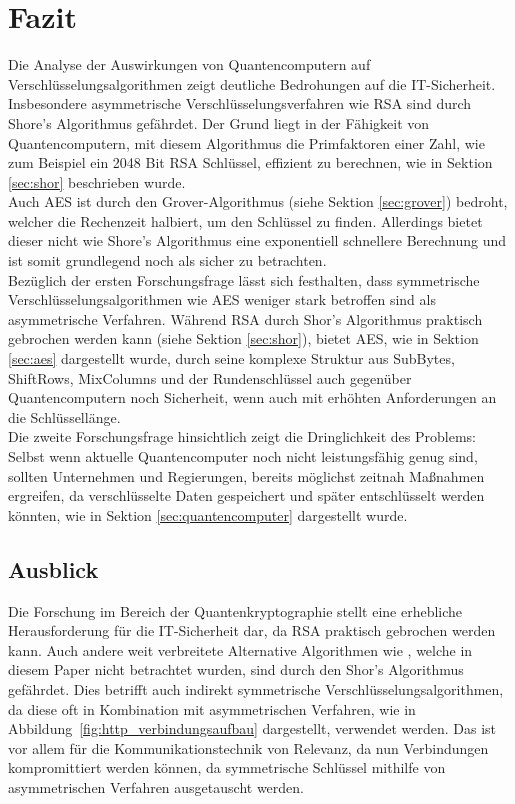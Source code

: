 \section{Fazit}
Die Analyse der Auswirkungen von Quantencomputern auf Verschlüsselungsalgorithmen
zeigt deutliche Bedrohungen auf die IT-Sicherheit. Insbesondere asymmetrische 
Verschlüsselungsverfahren wie RSA sind durch Shore's Algorithmus gefährdet. 
Der Grund liegt in der Fähigkeit von Quantencomputern, mit diesem Algorithmus
die Primfaktoren einer Zahl, wie zum Beispiel ein 2048 Bit RSA Schlüssel, 
effizient zu berechnen, wie in Sektion \ref{sec:shor} beschrieben wurde.\\
Auch AES ist durch den Grover-Algorithmus (siehe Sektion \ref{sec:grover}) bedroht, welcher die Rechenzeit 
halbiert, um den Schlüssel zu finden. Allerdings bietet dieser 
nicht wie Shore's Algorithmus eine exponentiell schnellere Berechnung und ist somit
grundlegend noch als sicher zu betrachten.\\
Bezüglich der ersten Forschungsfrage lässt sich festhalten, dass symmetrische 
Verschlüsselungsalgorithmen wie AES weniger stark betroffen sind als 
asymmetrische Verfahren. Während RSA durch Shor's Algorithmus praktisch 
gebrochen werden kann (siehe Sektion \ref{sec:shor}), bietet AES,
wie in Sektion \ref{sec:aes} dargestellt wurde, durch seine komplexe Struktur aus SubBytes, 
ShiftRows, MixColumns und der Rundenschlüssel auch gegenüber Quantencomputern 
noch Sicherheit, wenn auch mit erhöhten Anforderungen an die Schlüssellänge.\\
Die zweite Forschungsfrage hinsichtlich 
zeigt die Dringlichkeit des Problems: Selbst wenn 
aktuelle Quantencomputer noch nicht leistungsfähig 
genug sind, sollten Unternehmen und Regierungen, bereits möglichst zeitnah 
Maßnahmen ergreifen, da verschlüsselte Daten gespeichert 
und später entschlüsselt werden könnten, wie in Sektion 
\ref{sec:quantencomputer} dargestellt wurde.\\

\subsection{Ausblick}
Die Forschung im Bereich der Quantenkryptographie stellt eine erhebliche 
Herausforderung für die IT-Sicherheit dar, da RSA praktisch gebrochen werden 
kann. Auch andere weit verbreitete Alternative Algorithmen wie ,
welche in diesem Paper nicht betrachtet wurden,
sind durch den Shor's Algorithmus gefährdet. Dies betrifft auch indirekt symmetrische
Verschlüsselungsalgorithmen, da diese oft in Kombination 
mit asymmetrischen Verfahren, wie in Abbildung~\ref{fig:http_verbindungsaufbau} dargestellt, 
verwendet werden. Das ist vor allem für die Kommunikationstechnik von Relevanz, da nun
Verbindungen kompromittiert werden können, da symmetrische Schlüssel mithilfe
von asymmetrischen Verfahren ausgetauscht werden.\\


